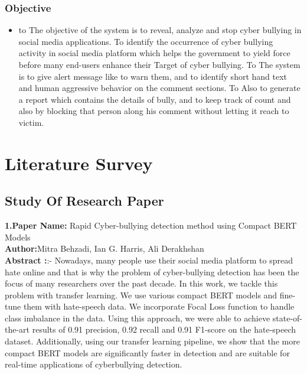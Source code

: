 \documentclass[oneside,a4paper,12pt]{report}
\begin{document}
\subsection{Objective}
\label{sec:problem}
\begin{itemize}


\item   to  The objective of the system is to reveal, analyze and stop cyber bullying in social    media applications. 
 To identify the occurrence of cyber bullying activity in social media platform which helps the government to yield force before many end-users enhance their Target of cyber bullying.
To The system is to give alert message like to warn them, and to identify short hand text and human aggressive behavior on the comment sections. 
To  Also to generate a report which contains the details of bully, and to keep track of count and also by blocking that person along his comment without letting it reach to victim.
\end{itemize}


\chapter{Literature Survey}
\section {Study Of Research Paper}
\item \textbf{1.Paper Name:} Rapid Cyber-bullying detection method using
Compact BERT Models
\\
\textbf{Author:}Mitra Behzadi, Ian G. Harris, Ali Derakhshan  \\
\textbf{Abstract :}:- Nowadays, many people use their social media
platform to spread hate online and that is why the problem of
cyber-bullying detection has been the focus of many researchers
over the past decade. In this work, we tackle this problem
with transfer learning. We use various compact BERT models
and fine-tune them with hate-speech data. We incorporate Focal
Loss function to handle class imbalance in the data. Using this
approach, we were able to achieve state-of-the-art results of 0.91
precision, 0.92 recall and 0.91 F1-score on the hate-speech dataset.
Additionally, using our transfer learning pipeline, we show
that the more compact BERT models are significantly faster in
detection and are suitable for real-time applications of cyberbullying
detection.  \\

\newpage
\end{document}
